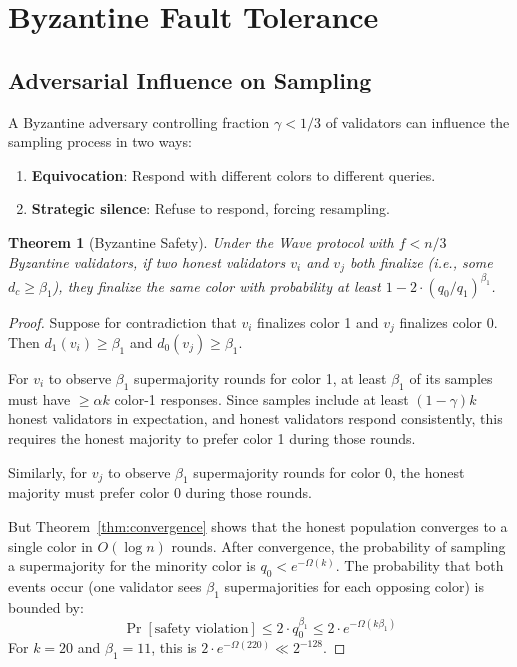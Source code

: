 \documentclass[11pt,a4paper]{article}
\newtheorem{theorem}{Theorem}[section]
\begin{document}
\section{Byzantine Fault Tolerance}
\label{sec:byzantine}

\subsection{Adversarial Influence on Sampling}

A Byzantine adversary controlling fraction $\gamma < 1/3$ of validators can influence
the sampling process in two ways:
\begin{enumerate}[nosep]
\item \textbf{Equivocation}: Respond with different colors to different queries.
\item \textbf{Strategic silence}: Refuse to respond, forcing resampling.
\end{enumerate}

\begin{theorem}[Byzantine Safety]
\label{thm:byz-safety}
Under the Wave protocol with $f < n/3$ Byzantine validators, if two honest validators
$v_i$ and $v_j$ both finalize (i.e., some $d_c \geq \beta_1$), they finalize the same
color with probability at least $1 - 2 \cdot (q_0/q_1)^{\beta_1}$.
\end{theorem}

\begin{proof}
Suppose for contradiction that $v_i$ finalizes color 1 and $v_j$ finalizes color 0.
Then $d_1(v_i) \geq \beta_1$ and $d_0(v_j) \geq \beta_1$.

For $v_i$ to observe $\beta_1$ supermajority rounds for color 1, at least $\beta_1$ of
its samples must have $\geq \alpha k$ color-1 responses. Since samples include at least
$(1-\gamma)k$ honest validators in expectation, and honest validators respond consistently,
this requires the honest majority to prefer color 1 during those rounds.

Similarly, for $v_j$ to observe $\beta_1$ supermajority rounds for color 0, the honest
majority must prefer color 0 during those rounds.

But Theorem~\ref{thm:convergence} shows that the honest population converges to a single
color in $O(\log n)$ rounds. After convergence, the probability of sampling a supermajority
for the minority color is $q_0 < e^{-\Omega(k)}$. The probability that both events occur
(one validator sees $\beta_1$ supermajorities for each opposing color) is bounded by:
\[
\Pr[\text{safety violation}] \leq 2 \cdot q_0^{\beta_1} \leq 2 \cdot e^{-\Omega(k \beta_1)}
\]
For $k = 20$ and $\beta_1 = 11$, this is $2 \cdot e^{-\Omega(220)} \ll 2^{-128}$.
\end{proof}
\end{document}
